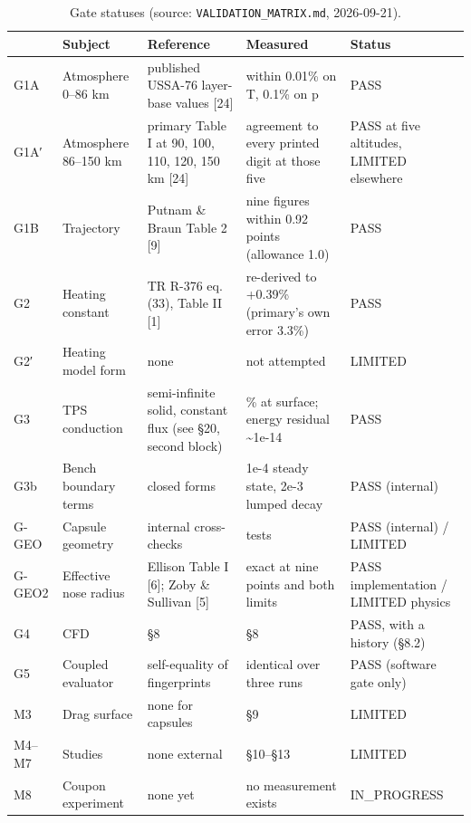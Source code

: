 \documentclass[
  a4paper,
  11pt]{article}
\newcommand{\tabhead}[1]{{\sffamily\bfseries\fontsize{8.5}{10.5}\selectfont #1}}
\begin{document}
\begin{table}[htbp]
\caption{Gate statuses (source: \texttt{VALIDATION\_\allowbreak{}MATRIX.md},
2026-09-21).}
\small\centering
\begin{tabular}{@{}>{\raggedright\arraybackslash}p{}>{\raggedright\arraybackslash}p{}>{\raggedright\arraybackslash}p{}>{\raggedright\arraybackslash}p{}>{\raggedright\arraybackslash}p{}@{}}
\toprule
\tabhead{Gate} & \tabhead{Subject} & \tabhead{Reference} & \tabhead{Measured} & \tabhead{Status} \\
\midrule
G1A & Atmosphere 0--86 km & published USSA-76 layer-base values {[}24{]} & within 0.01\% on T, 0.1\% on p & PASS \\
G1A{\symfont ′} & Atmosphere 86--150 km & primary Table I at 90, 100, 110, 120, 150 km {[}24{]} & agreement to every printed digit at those five & PASS at five altitudes, LIMITED elsewhere \\
G1B & Trajectory & Putnam \& Braun Table 2 {[}9{]} & nine figures within 0.92 points (allowance 1.0) & PASS \\
G2 & Heating constant & TR R-376 eq. (33), Table II {[}1{]} & re-derived to +0.39\% (primary's own error 3.3\%) & PASS \\
G2{\symfont ′} & Heating model form & none & not attempted & LIMITED \\
G3 & TPS conduction & semi-infinite solid, constant flux (see §20, second block) & 0.002\% at surface; energy residual \textasciitilde1e-14 & PASS \\
G3b & Bench boundary terms & closed forms & 1e-4 steady state, 2e-3 lumped decay & PASS (internal) \\
G-GEO & Capsule geometry & internal cross-checks & 42 tests & PASS (internal) / LIMITED \\
G-GEO2 & Effective nose radius & Ellison Table I {[}6{]}; Zoby \& Sullivan {[}5{]} & exact at nine points and both limits & PASS implementation / LIMITED physics \\
G4 & CFD & §8 & §8 & PASS, with a history (§8.2) \\
G5 & Coupled evaluator & self-equality of fingerprints & identical over three runs & PASS (software gate only) \\
M3 & Drag surface & none for capsules & §9 & LIMITED \\
M4--M7 & Studies & none external & §10--§13 & LIMITED \\
M8 & Coupon experiment & none yet & no measurement exists & IN\_PROGRESS \\
\bottomrule
\end{tabular}
\end{table}
\end{document}
